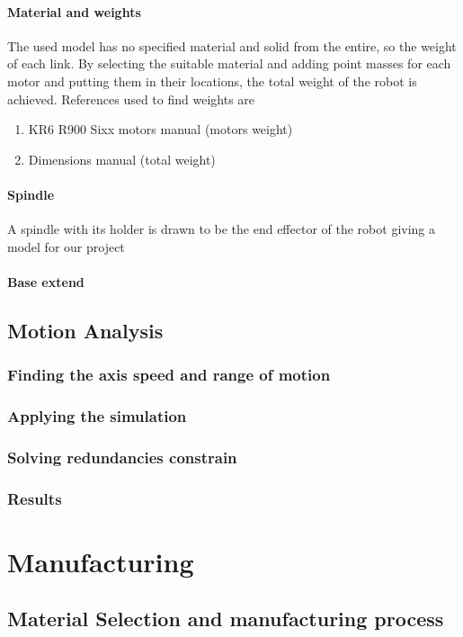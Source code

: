 \documentclass{book}
\begin{document}
				\paragraph{Material and weights}
				The used model has no specified material and solid from the entire, so the weight of each link. 
				By selecting the suitable material and adding point masses for each motor and putting them in their locations, the total weight of the robot is achieved.
				References used to find weights are
				\begin{enumerate}
					\item KR6 R900 Sixx motors manual (motors weight)
					\item Dimensions manual (total weight)
				\end{enumerate}
				\paragraph{Spindle}
				A spindle with its holder is drawn to be the end effector of the robot giving a model for our project 
				\paragraph{Base extend}
			
			\subsection{Motion Analysis}
				\subsubsection{Finding the axis speed and range of motion}
				\subsubsection{Applying the simulation}
				\subsubsection{Solving redundancies constrain }
				\subsubsection{Results}
					
					
		\newpage
		\section{Manufacturing}
			\subsection{Material Selection and manufacturing process}
			
\end{document}
